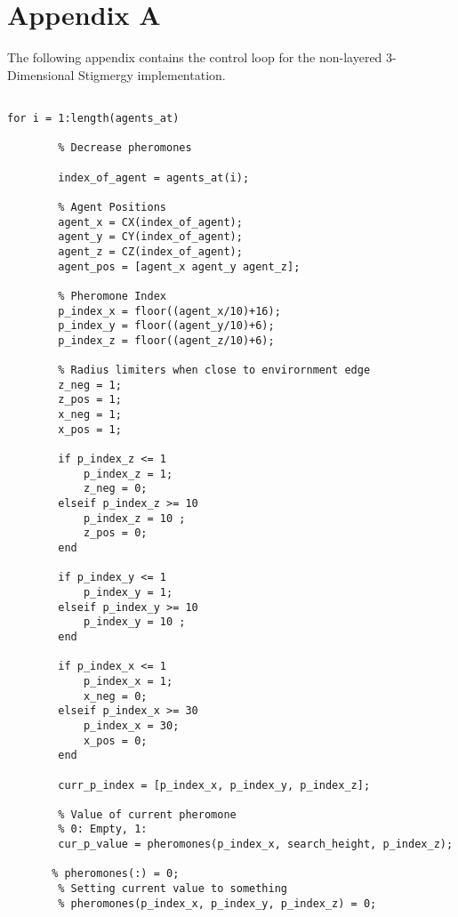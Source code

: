 
\chapter{Appendix A}

The following appendix contains the control loop for the non-layered 3-Dimensional Stigmergy implementation. \\


\begin{lstlisting}

for i = 1:length(agents_at)
        
        % Decrease pheromones
        
        index_of_agent = agents_at(i);
        
        % Agent Positions
        agent_x = CX(index_of_agent);
        agent_y = CY(index_of_agent);
        agent_z = CZ(index_of_agent);        
        agent_pos = [agent_x agent_y agent_z];
        
        % Pheromone Index
        p_index_x = floor((agent_x/10)+16);
        p_index_y = floor((agent_y/10)+6);
        p_index_z = floor((agent_z/10)+6);
        
        % Radius limiters when close to envirornment edge
        z_neg = 1;
        z_pos = 1;
        x_neg = 1;
        x_pos = 1;
        
        if p_index_z <= 1 
            p_index_z = 1;
            z_neg = 0;
        elseif p_index_z >= 10 
            p_index_z = 10 ;
            z_pos = 0;
        end
        
        if p_index_y <= 1 
            p_index_y = 1;
        elseif p_index_y >= 10 
            p_index_y = 10 ;
        end
        
        if p_index_x <= 1 
            p_index_x = 1;
            x_neg = 0;
        elseif p_index_x >= 30 
            p_index_x = 30;
            x_pos = 0;
        end
        
        curr_p_index = [p_index_x, p_index_y, p_index_z];
        
        % Value of current pheromone
        % 0: Empty, 1: 
        cur_p_value = pheromones(p_index_x, search_height, p_index_z);
        
       % pheromones(:) = 0;
        % Setting current value to something
        % pheromones(p_index_x, p_index_y, p_index_z) = 0;



\end{lstlisting}
